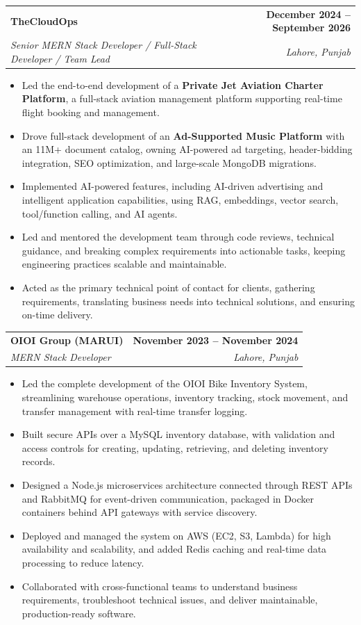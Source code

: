 \documentclass[letterpaper,11pt]{article}
\makeatletter
\newcommand{\resumeItem}[1]{\item\small{{#1 \vspace{-2pt}}}}
\newcommand{\resumeSubheading}[4]{
  \vspace{-2pt}\item
  \begin{tabular*}{1.0\textwidth}[t]{l@{\extracolsep{\fill}}r}
    \textbf{#1} & \textbf{\small #2} \\
    \textit{\small #3} & \textit{\small #4} \\
  \end{tabular*}\vspace{-7pt}
}
\newcommand{\resumeItemListStart}{\begin{itemize}}
\newcommand{\resumeItemListEnd}{\end{itemize}\vspace{-5pt}}
\makeatother
\begin{document}
  \resumeSubheading
    {TheCloudOps}{December 2024 -- September 2026}
    {Senior MERN Stack Developer / Full-Stack Developer / Team Lead}{Lahore, Punjab}
    \vspace{-2pt}
  \resumeItemListStart
    \resumeItem{Led the end-to-end development of a {\textbf{Private Jet Aviation Charter Platform}}, a full-stack aviation management platform supporting real-time flight booking and management.}
    \resumeItem{Drove full-stack development of an {\textbf{Ad-Supported Music Platform}} with an 11M+ document catalog, owning AI-powered ad targeting, header-bidding integration, SEO optimization, and large-scale MongoDB migrations.}
    \resumeItem{Implemented AI-powered features, including AI-driven advertising and intelligent application capabilities, using RAG, embeddings, vector search, tool/function calling, and AI agents.}
    \resumeItem{Led and mentored the development team through code reviews, technical guidance, and breaking complex requirements into actionable tasks, keeping engineering practices scalable and maintainable.}
    \resumeItem{Acted as the primary technical point of contact for clients, gathering requirements, translating business needs into technical solutions, and ensuring on-time delivery.}
  \resumeItemListEnd

  \resumeSubheading
    {OIOI Group (MARUI)}{November 2023 -- November 2024}
    {MERN Stack Developer}{Lahore, Punjab}
    \vspace{-2pt}
  \resumeItemListStart
    \resumeItem{Led the complete development of the OIOI Bike Inventory System, streamlining warehouse operations, inventory tracking, stock movement, and transfer management with real-time transfer logging.}
    \resumeItem{Built secure APIs over a MySQL inventory database, with validation and access controls for creating, updating, retrieving, and deleting inventory records.}
    \resumeItem{Designed a Node.js microservices architecture connected through REST APIs and RabbitMQ for event-driven communication, packaged in Docker containers behind API gateways with service discovery.}
    \resumeItem{Deployed and managed the system on AWS (EC2, S3, Lambda) for high availability and scalability, and added Redis caching and real-time data processing to reduce latency.}
    \resumeItem{Collaborated with cross-functional teams to understand business requirements, troubleshoot technical issues, and deliver maintainable, production-ready software.}
  \resumeItemListEnd
\end{document}
